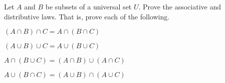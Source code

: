 \item \label{ex:set_props} Let $A$ and $B$ be subsets of a universal set $U$. Prove the associative and distributive laws. That is, prove each of the following.
	\ba
	\item $(A \cap B) \cap C = A \cap (B \cap C)$ 
	\item $(A \cup B) \cup C = A \cup (B \cup C)$ 
	\item $A \cap (B \cup C) = (A \cap B) \cup (A \cap C)$ 
	\item$A \cup (B \cap C) = (A \cup B) \cap (A \cup C)$ 
	\ea
	
\begin{comment}

\ExerciseSolution

	\ba
	\item Suppose that $x \in (A \cap B) \cap C$. Then $x \in A \cap B$ and $x \in C$. So $x \in A$ and $x \in B$, and $x \in C$. It follows that $x \in A$ and $x \in B \cap C$, so $x \in  A \cap (B \cap C)$. Thus, $(A \cap B) \cap C \subseteq  A \cap (B \cap C)$. 
	
	Now suppose that $x \in A \cap (B \cap C)$. Then $x \in A$ and $x \in B \cap C$. So $x \in A$, and $x \in B$ and $x \in C$. Thus, $x \in A \cap B$ and $x \in C$ or $x \in (A \cap B) \cap C$. It follows that $A \cap (B \cap C) \subseteq (A \cap B) \cap C$. The two containments show that $(A \cap B) \cap C = A \cap (B \cap C)$.
	
	\item Suppose that $x \in (A \cup B) \cup C$. Then $x \in A \cup B$ or $x \in C$. Thus, $x \in A$ or $x \in B$, or $x \in C$. This means that $x \in A$ or $x \in B \cup C$. It follows that $x \in A \cup (B \cup C)$ and so $(A \cup B) \cup C \subseteq A \cup (B \cup C)$. 
	
	Now suppose that $x \in A \cup (B \cup C)$. Then $x \in A$ or $x \in B \cup C$. From this we can say that $x \in A$, or $x \in B$ or $x \in C$. Then $x \in A \cup B$ or $x \in C$. It follows that that $x \in (A \cup B) \cup C$ and $A \cup (B \cup C) \subseteq (A \cup B) \cup C$. The two containments show that $(A \cup B) \cup C = A \cup (B \cup C)$. 
	
	\item Suppose that $x \in A \cap (B \cup C)$. Then $x \in A$ and $x \in B \cup C$. So $x \in A$ and $x$ is in one of $B$ or $C$. If $x in B$, then $x \in A \cap B$. If $x \in C$, then $x \in A \cap C$. In either case, $x \in (A \cap B) \cup (A \cap C)$. So $A \cap (B \cup C) \subseteq (A \cap B) \cup (A \cap C)$.
	

\end{comment}
